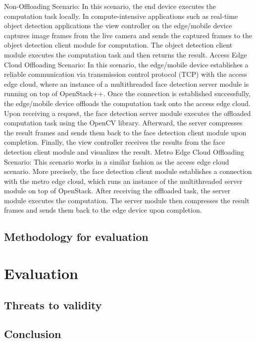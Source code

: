 \documentclass[conference]{IEEEtran}
\begin{document}
Non-Offloading Scenario: In this scenario, the end device executes the computation task locally. In compute-intensive applications such as real-time object detection applications the view 
controller on the edge/mobile device captures image frames from the live camera and sends the captured frames to the object detection client module for computation. The object detection client module executes the computation task and then returns the result. 
Access Edge Cloud Offloading Scenario: In this scenario, the edge/mobile device establishes a 
reliable communication via transmission control protocol (TCP) with the access edge cloud, where 
an instance of a multithreaded face detection 
server module is running on top of OpenStack++. 
Once the connection is established successfully, 
the edge/mobile device offloads the computation 
task onto the access edge cloud. Upon receiving a request, the face detection server module 
executes the offloaded computation task using 
the OpenCV library. Afterward, the server compresses the result frames and sends them back 
to the face detection client module upon completion. Finally, the view controller receives the 
results from the face detection client module and 
visualizes the result.
Metro Edge Cloud Offloading Scenario: This 
scenario works in a similar fashion as the access 
edge cloud scenario. More precisely, the face 
detection client module establishes a connection with the metro edge cloud, which runs an 
instance of the multithreaded server module on 
top of OpenStack. After receiving the offloaded 
task, the server module executes the computation. The server module then compresses the 
result frames and sends them back to the edge 
device upon completion.
\subsection{Methodology for evaluation}


\section{Evaluation}


\subsection{Threats to validity}


\subsection{Conclusion}




\end{document}
